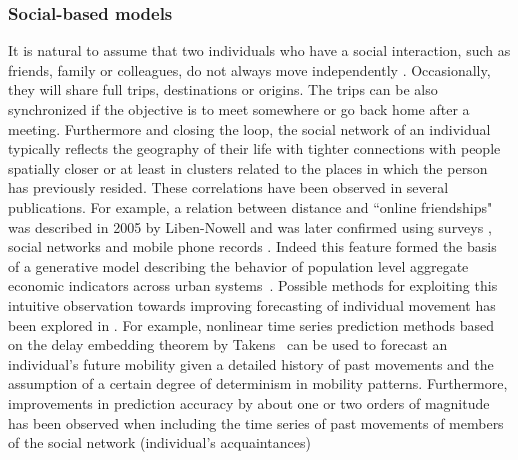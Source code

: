 \subsubsection{Social-based models}
\label{sec:social}

It is natural to assume that two individuals who have a social interaction, such as friends, family or colleagues, do not always move independently \cite{axhausen_2005_social,carrasco_2006_exploring,dugunji_2005_discrete}. Occasionally, they will share full trips, destinations or origins. The trips can be also synchronized if the objective is to meet somewhere or go back home after a meeting. Furthermore and closing the loop, the social network of an individual typically reflects the geography of their life with tighter connections with people spatially closer or at least in clusters related to the places in which the person has previously resided. These correlations have been observed in several publications. For example, a relation between distance and ``online friendships" was described in 2005 by Liben-Nowell \et \cite{liben-nowell_2005_geographic} and was later confirmed using surveys \cite{carrasco_2008_how,vandenberg_2013_path}, social networks \cite{carrasco_2008_collecting,carrasco_2008_agency} and  mobile phone records \cite{lambiotte_2008_geographical,krings_2009_urban,phithakkitnukoon_2012_socio}. Indeed this feature formed the basis of a generative model describing the behavior of population level aggregate economic indicators across urban systems~\cite{Pan_2013_UrbanScaling}. Possible methods for exploiting this intuitive observation towards improving forecasting of individual movement has been explored in \cite{de_2013_interdependence}.
For example, nonlinear time series prediction methods based on the delay embedding theorem by Takens~\cite{Takens_1981_Delay} can be used to forecast an individual's future mobility given a detailed history of past movements and the assumption of a certain degree of determinism in mobility patterns.
Furthermore, improvements in prediction accuracy by about one or two orders of magnitude has been observed when including the time series of past movements of members of the social network (individual's acquaintances)  

